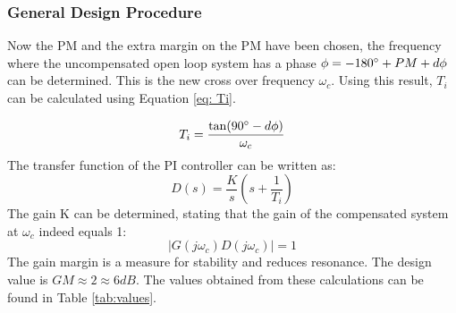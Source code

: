 \documentclass[a4paper,kul]{kulakarticle} %
\begin{document}
\subsubsection{General Design Procedure}
\label{sec:designprocedure}
Now the PM and the extra margin on the PM have been chosen, the frequency where the uncompensated open loop system has a phase $\phi = -180\degree + PM + d\phi$ can be determined. This is the new cross over frequency $\omega_c$. Using this result, $T_i$ can be calculated using Equation \ref{eq: Ti}. 

\begin{equation}
	\label{eq: Ti}
	T_i = \frac{\tan(90\degree - d\phi)}{\omega_c}
\end{equation} 
The transfer function of the PI controller can be written as:
\begin{equation}
	\label{eq: TF PI}
	D(s) = \frac{K}{s}(s+\frac{1}{T_i})
\end{equation}
The gain K can be determined, stating that the gain of the compensated system at $\omega_c$ indeed equals 1:
\begin{equation}
	|G(j\omega_c)D(j\omega_c)| = 1
\end{equation}
The gain margin is a measure for stability and reduces resonance. The design value is $GM \approx 2 \approx 6 dB$. The values obtained from these calculations can be found in Table \ref{tab:values}. 
\end{document}
